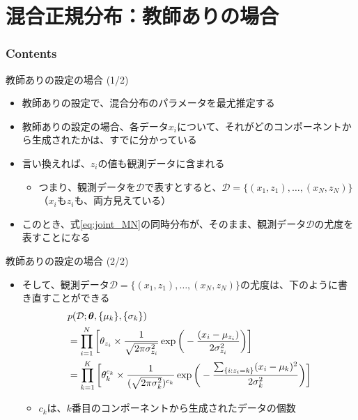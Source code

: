 \documentclass[aspectratio=169,unicode,dvipdfmx,14pt]{beamer}
\begin{document}
\section{混合正規分布：教師ありの場合}

\begin{frame}\frametitle{Contents}
\Large \tableofcontents[currentsection]
\end{frame}


\begin{frame}{教師ありの設定の場合 (1/2)}
\begin{itemize}
\item 教師ありの設定で、混合分布のパラメータを最尤推定する
\item 教師ありの設定の場合、各データ$x_i$について、それがどのコンポーネントから生成されたかは、すでに分かっている
\item 言い換えれば、$z_i$の値も観測データに含まれる
\begin{itemize}
\item つまり、観測データを$\mathcal{D}$で表すとすると、$\mathcal{D} = \{ (x_1,z_1), \ldots, (x_N,z_N) \}$
（$x_i$も$z_i$も、両方見えている）
\end{itemize}
\item このとき、式\eqref{eq:joint_MN}の同時分布が、そのまま、観測データ$\mathcal{D}$の尤度を表すことになる
\end{itemize}
\end{frame}

\begin{frame}{教師ありの設定の場合 (2/2)}
\begin{itemize}
\item そして、観測データ$\mathcal{D} = \{ (x_1,z_1), \ldots, (x_N,z_N) \}$の尤度は、下のように書き直すことができる
\vspace{-.15in}
\begin{align}
& p(\mathcal{D};\bm{\theta}, \{ \mu_k \}, \{ \sigma_k \} )
\notag \\ &
= \prod_{i=1}^N \bigg[ \theta_{z_i} \times \frac{1}{\sqrt{2\pi\sigma_{z_i}^2}}\exp\bigg( - \frac{(x_i - \mu_{z_i})}{2\sigma_{z_i}^2} \bigg) \bigg]
\notag \\ &
= \prod_{k=1}^K \bigg[ \theta_k^{c_k} \times \frac{1}{ (\sqrt{2\pi\sigma_k^2} )^{c_k}} 
\exp\bigg( - \frac{ \sum_{ \{ i : z_i = k \} } (x_i - \mu_k)^2 }{2\sigma_k^2} \bigg) \bigg]
\label{eq:likelihood_MN}
\end{align}
\vspace{-.15in}
\begin{itemize}
\item $c_k$は、$k$番目のコンポーネントから生成されたデータの個数
\end{itemize}
\end{itemize}
\end{frame}
\end{document}
